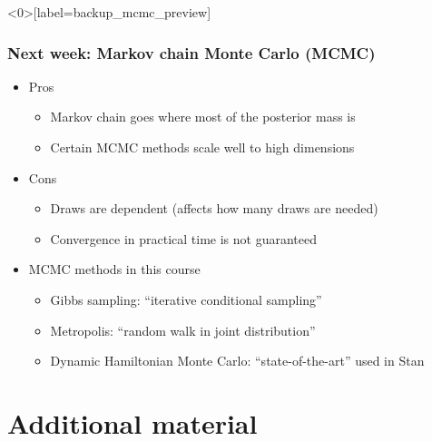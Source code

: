 \documentclass[10pt]{beamer}
\begin{document}
\begin{frame}<0>[label=backup_mcmc_preview]
\frametitle{Next week: Markov chain Monte Carlo (MCMC)}

  \begin{itemize}
  \item Pros
    \begin{itemize}
    \item Markov chain goes where most of the posterior mass is
    \item Certain MCMC methods scale well to high dimensions
    \end{itemize}
  \item Cons
    \begin{itemize}
    \item Draws are dependent (affects how many draws are needed)
    \item Convergence in practical time is not guaranteed
    \end{itemize}
  \pause
  \item MCMC methods in this course
    \begin{itemize}
    \item Gibbs sampling: ``iterative conditional sampling''
    \item Metropolis: ``random walk in joint distribution''
    \item Dynamic Hamiltonian Monte Carlo: ``state-of-the-art'' used in Stan
    \end{itemize}
  \end{itemize}

\end{frame}


\section{Additional material}
\frame{\sectionpage}


\end{document}
